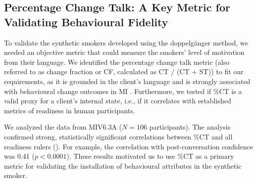 \subsection*{Percentage Change Talk: A Key Metric for Validating Behavioural Fidelity}

To validate the synthetic smokers developed using the doppelgänger method, we needed an
objective metric that could measure the smokers' level of motivation from their
language. We identified the percentage change talk metric (also referred to as change
fraction or CF, calculated as CT / (CT + ST)) to fit our requirements, as it is
grounded in the client's language and is strongly associated with behavioural change
outcomes in MI \cite{Barnett2014,Houck2018,Moyers2009,Baer2008}. Furthermore, we tested
if \%CT is a valid proxy for a client's internal state, i.e., if it correlates with
established metrics of readiness in human participants.

We analyzed the data from MIV6.3A ($N=106$ participants). The analysis confirmed
strong, statistically significant correlations between \%CT and all readiness rulers
(). For example, the correlation with post-conversation
confidence was 0.41 ($p < 0.0001$). These results motivated us to use \%CT as a primary
metric for validating the installation of behavioural attributes in the synthetic
smoker.

